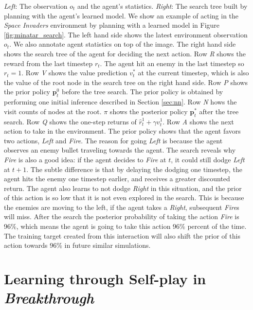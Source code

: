 {
    \textit{Left}: The observation \(o_t\) and the agent's statistics.
    \textit{Right}: The search tree built by planning with the agent's learned model.
}
We show an example of \moozi acting in the \textit{Space Invaders} environment by planning with a learned model in Figure \ref{fig:minatar_search}.
The left hand side shows the latest environment observation $o_t$.
We also annotate agent statistics on top of the image.
The right hand side shows the search tree of the agent for deciding the next action.
Row \textit{R} shows the reward from the last timestep $r_t$.
The agent hit an enemy in the last timestep so $r_t = 1$.
Row \textit{V} shows the value prediction $v_t^{*}$ at the current timestep, which is also the value of the root node in the search tree on the right hand side.
Row \textit{P} shows the prior policy $\mathbf{p}^0_t$ before the tree search.
The prior policy is obtained by performing one initial inference described in Section \ref{sec:nn}.
Row \textit{N} hows the visit counts of nodes at the root.
\(\pi\) shows the posterior policy $\mathbf{p}^*_t$ after the tree search.
Row \textit{Q} shows the one-step returns of  \(\hat{r}_t^1 + \gamma v_t^1\).
Row \textit{A} shows the next action to take in the environment.
The prior policy shows that the agent favors two actions, \textit{Left} and \textit{Fire}.
The reason for going \textit{Left} is because the agent observes an enemy bullet traveling towards the agent.
The search reveals why \textit{Fire} is also a good idea: if the agent decides to \textit{Fire} at $t$, it could still dodge \textit{Left} at $t+1$.
The subtle difference is that by delaying the dodging one timestep, the agent hits the enemy one timestep earlier, and receives a greater discounted return.
The agent also learns to not dodge \textit{Right} in this situation, and the prior of this action is so low that it is not even explored in the search.
This is because the enemies are moving to the left, if the agent takes a \textit{Right}, subsequent \textit{Fire}s will miss.
After the search the posterior probability of taking the action \textit{Fire} is 96\%, which means the agent is going to take this action 96\% percent of the time.
The training target created from this interaction will also shift the prior of this action towards 96\% in future similar simulations.


\section{Learning through Self-play in \textit{Breakthrough}} \label{sec:exp:breakthrough}

